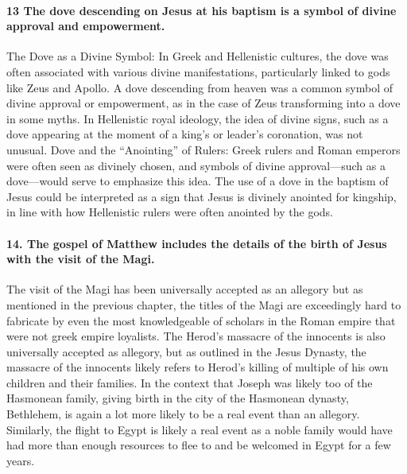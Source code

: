 \paragraph{13 The dove descending on Jesus at his baptism is a symbol of divine approval and empowerment.}\label{par:the-dove-descending-on-jesus-at-his-baptism-is-a-symbol-of-divine-approval-and-empowerment.}

The Dove as a Divine Symbol: In Greek and Hellenistic cultures, the dove was often associated with various divine manifestations, particularly linked to gods like Zeus and Apollo.
A dove descending from heaven was a common symbol of divine approval or empowerment, as in the case of Zeus transforming into a dove in some myths.
In Hellenistic royal ideology, the idea of divine signs, such as a dove appearing at the moment of a king's or leader's coronation, was not unusual.
Dove and the ``Anointing'' of Rulers: Greek rulers and Roman emperors were often seen as divinely chosen, and symbols of divine approval---such as a dove---would serve to emphasize this idea.
The use of a dove in the baptism of Jesus could be interpreted as a sign that Jesus is divinely anointed for kingship, in line with how Hellenistic rulers were often anointed by the gods.

\paragraph{14.
The gospel of Matthew includes the details of the birth of Jesus with the visit of the Magi.}\label{par:the-gospel-of-matthew-includes-the-details-of-the-birth-of-jesus-with-the-visit-of-the-magi.}

The visit of the Magi has been universally accepted as an allegory but as mentioned in the previous chapter, the titles of the Magi are exceedingly hard to fabricate by even the most knowledgeable of scholars in the Roman empire that were not greek empire loyalists.
The Herod's massacre of the innocents is also universally accepted as allegory, but as outlined in the Jesus Dynasty, the massacre of the innocents likely refers to Herod's killing of multiple of his own children and their families.
In the context that Joseph was likely too of the Hasmonean family, giving birth in the city of the Hasmonean dynasty, Bethlehem, is again a lot more likely to be a real event than an allegory.
Similarly, the flight to Egypt is likely a real event as a noble family would have had more than enough resources to flee to and be welcomed in Egypt for a few years.

